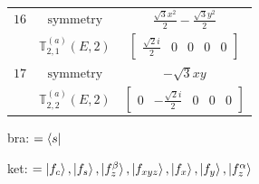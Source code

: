 \documentclass[fleqn,8pt,landscape]{jsarticle}
\begin{document}
\begin{longtable}{ccc}
$ 16 $ & $ \text{symmetry} $ & $ \frac{\sqrt{3} x^{2}}{2} - \frac{\sqrt{3} y^{2}}{2} $ \\
$  $ & $ \mathbb{T}_{2,1}^{(a)}(E,2) $ & $ \begin{bmatrix} \frac{\sqrt{2} i}{2} & 0 & 0 & 0 & 0 \end{bmatrix} $ \\ \hline
$ 17 $ & $ \text{symmetry} $ & $ - \sqrt{3} x y $ \\
$  $ & $ \mathbb{T}_{2,2}^{(a)}(E,2) $ & $ \begin{bmatrix} 0 & - \frac{\sqrt{2} i}{2} & 0 & 0 & 0 \end{bmatrix} $ \\ \hline
\end{longtable}
bra: $=\bra{s}$

\noindent
ket: $=\ket{f_{c}}, \ket{f_{s}}, \ket{f_{z}^{\beta}}, \ket{f_{xyz}}, \ket{f_{x}}, \ket{f_{y}}, \ket{f_{z}^{\alpha}}$
\renewcommand{\arraystretch}{1.6}
\end{document}

